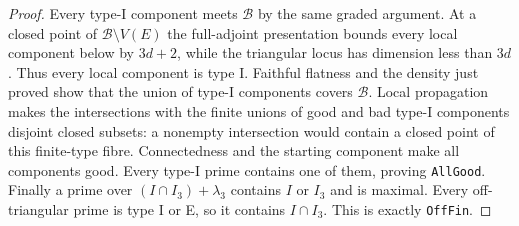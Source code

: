 \begin{proof}
Every type-I component meets $\mathcal B$ by the same graded argument.
At a closed point of $\mathcal B\setminus V(E)$ the full-adjoint
presentation bounds every local component below by $3d+2$, while
the triangular locus has dimension less than $3d$.  Thus every
local component is type I.  Faithful flatness and the density just proved show that
the union of type-I components covers $\mathcal B$.
Local propagation makes the intersections with the finite unions
of good and bad type-I components disjoint closed subsets: a
nonempty intersection would contain a closed point of this finite-type
fibre.  Connectedness and the starting component make all components
good.  Every type-I prime contains one of them, proving \texttt{AllGood}.
Finally a prime over $(I\cap I_3)+\lambda_3$ contains $I$ or $I_3$
and is maximal.  Every off-triangular prime is type I or E, so it
contains $I\cap I_3$.  This is exactly \texttt{OffFin}.
\end{proof}

